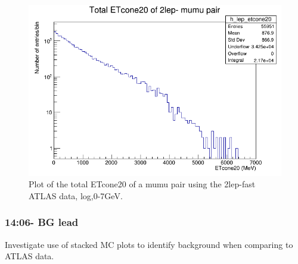 \begin{figure}[h!]
    \centering
	\includegraphics[width=0.85\linewidth]{plots/16-02-2021/2lep-fast_mumu-pair_etcone20(total)_log-entries_0-7GeV_16-02-2021_11-33.png}
	\caption{Plot of the total ETcone20 of a mumu pair using the 2lep-fast ATLAS data, log,0-7GeV. }\label{fig:2lep-fast_mumu-pair_etcone20(total)_log-entries_0-7GeV_16-02-2021_11-33}
\end{figure}



\subsubsection*{14:06- BG lead}
Investigate use of stacked MC plots to identify background when comparing to ATLAS data.

